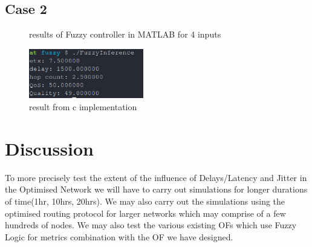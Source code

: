 \subsection{Case 2} \label{Case 2: 4 metrics}
\begin{figure}[H]
\centering
{}
\caption{results of Fuzzy controller in MATLAB for 4 inputs}
\label{fig:method}
\end{figure}
\begin{figure}[h!]
\centering
\includegraphics[width=50mm]{result4inputcode.png}
\caption{result from c implementation}
\end{figure}
\section{Discussion} \label{Discussion}
To more precisely test the extent of the influence of Delays/Latency and Jitter in the Optimised Network we will have to carry out simulations for longer durations of time(1hr, 10hrs, 20hrs).
We may also carry out the simulations using the optimised routing protocol for larger networks which may comprise of a few hundreds of nodes.
We may also test the various existing OFs which use Fuzzy Logic for metrics combination with the OF we have designed.
